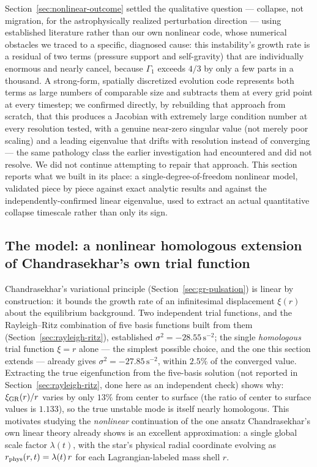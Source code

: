 \documentclass[11pt]{article}
\begin{document}
Section~\ref{sec:nonlinear-outcome} settled the qualitative question --- collapse, not migration, for the astrophysically realized perturbation direction --- using established literature rather than our own nonlinear code, whose numerical obstacles \citep{OwnbyPhase2} we traced to a specific, diagnosed cause: this instability's growth rate is a residual of two terms (pressure support and self-gravity) that are individually enormous and nearly cancel, because $\Gamma_1$ exceeds $4/3$ by only a few parts in a thousand. A strong-form, spatially discretized evolution code represents both terms as large numbers of comparable size and subtracts them at every grid point at every timestep; we confirmed directly, by rebuilding that approach from scratch, that this produces a Jacobian with extremely large condition number at every resolution tested, with a genuine near-zero singular value (not merely poor scaling) and a leading eigenvalue that drifts with resolution instead of converging --- the same pathology class the earlier investigation \citep{OwnbyPhase2} had encountered and did not resolve. We did not continue attempting to repair that approach. This section reports what we built in its place: a single-degree-of-freedom nonlinear model, validated piece by piece against exact analytic results and against the independently-confirmed linear eigenvalue, used to extract an actual quantitative collapse timescale rather than only its sign.

\subsection{The model: a nonlinear homologous extension of Chandrasekhar's own trial function}
\label{sec:homologous-model}

Chandrasekhar's variational principle (Section~\ref{sec:gr-pulsation}) is linear by construction: it bounds the growth rate of an infinitesimal displacement $\xi(r)$ about the equilibrium background. Two independent trial functions, and the Rayleigh--Ritz combination of five basis functions built from them (Section~\ref{sec:rayleigh-ritz}), established $\sigma^2=-28.55\,\mathrm{s}^{-2}$; the single \emph{homologous} trial function $\xi=r$ alone --- the simplest possible choice, and the one this section extends --- already gives $\sigma^2=-27.85\,\mathrm{s}^{-2}$, within $2.5\%$ of the converged value. Extracting the true eigenfunction from the five-basis solution (not reported in Section~\ref{sec:rayleigh-ritz}, done here as an independent check) shows why: $\xi_{\rm GR}(r)/r$ varies by only $13\%$ from center to surface (the ratio of center to surface values is $1.133$), so the true unstable mode is itself nearly homologous. This motivates studying the \emph{nonlinear} continuation of the one ansatz Chandrasekhar's own linear theory already shows is an excellent approximation: a single global scale factor $\lambda(t)$, with the star's physical radial coordinate evolving as $r_{\rm phys}(r,t)=\lambda(t)\,r$ for each Lagrangian-labeled mass shell $r$.
\end{document}
